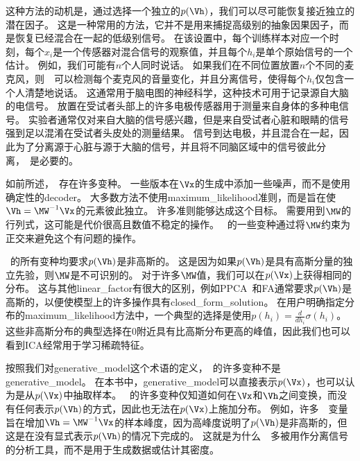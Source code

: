 这种方法的动机是，通过选择一个独立的$p(\Vh)$，我们可以尽可能恢复接近独立的潜在因子。
这是一种常用的方法，它并不是用来捕捉高级别的抽象因果因子，而是恢复已经混合在一起的低级别信号。
在该设置中，每个训练样本对应一个时刻，每个$x_i$是一个传感器对混合信号的观察值，并且每个$h_i$是单个原始信号的一个估计。
例如，我们可能有$n$个人同时说话。 
如果我们在不同位置放置$n$个不同的麦克风，则~~可以检测每个麦克风的音量变化，并且分离信号，使得每个$h_i$仅包含一个人清楚地说话。
这通常用于脑电图的神经科学，这种技术可用于记录源自大脑的电信号。
放置在受试者头部上的许多电极传感器用于测量来自身体的多种电信号。
实验者通常仅对来自大脑的信号感兴趣，但是来自受试者心脏和眼睛的信号强到足以混淆在受试者头皮处的测量结果。
信号到达电极，并且混合在一起，因此为了分离源于心脏与源于大脑的信号，并且将不同脑区域中的信号彼此分离，~是必要的。


如前所述，~存在许多变种。
一些版本在$\Vx$的生成中添加一些噪声，而不是使用确定性的\gls{decoder}。
大多数方法不使用\gls{maximum_likelihood}准则，而是旨在使$\Vh = \MW^{-1}\Vx$的元素彼此独立。
许多准则能够达成这个目标。
需要用到$\MW$的行列式，这可能是代价很高且数值不稳定的操作。
~的一些变种通过将$\MW$约束为正交来避免这个有问题的操作。


~的所有变种均要求$p(\Vh)$是非高斯的。
这是因为如果$p(\Vh)$是具有高斯分量的独立先验，则$\MW$是不可识别的。
对于许多$\MW$值，我们可以在$p(\Vx)$上获得相同的分布。 
这与其他\gls{linear_factor}有很大的区别，例如\gls{PPCA}~和\gls{FA}通常要求$p(\Vh)$是高斯的，以便使模型上的许多操作具有\gls{closed_form_solution}。
在用户明确指定分布的\gls{maximum_likelihood}方法中，一个典型的选择是使用$p(h_i) = \frac{d}{dh_i}\sigma(h_i)$。
这些非高斯分布的典型选择在$0$附近具有比高斯分布更高的峰值，因此我们也可以看到\gls{ICA}经常用于学习稀疏特征。




按照我们对\gls{generative_model}这个术语的定义，~的许多变种不是\gls{generative_model}。
在本书中，\gls{generative_model}可以直接表示$p(\Vx)$，也可以认为是从$p(\Vx)$中抽取样本。
~的许多变种仅知道如何在$\Vx$和$\Vh$之间变换，而没有任何表示$p(\Vh)$的方式，因此也无法在$p(\Vx)$上施加分布。
例如，许多~~变量旨在增加$\Vh = \MW^{-1}\Vx$的样本峰度，因为高峰度说明了$p(\Vh)$是非高斯的，但这是在没有显式表示$p(\Vh)$的情况下完成的。
这就是为什么~~多被用作分离信号的分析工具，而不是用于生成数据或估计其密度。


